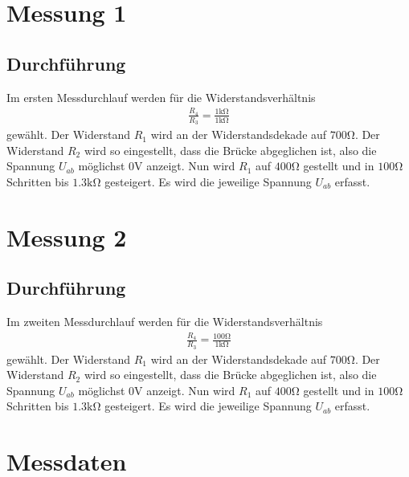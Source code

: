 \section[Messung 1]{Messung 1}
\subsection{Durchführung}

Im ersten Messdurchlauf werden für die Widerstandsverhältnis
\begin{align}
    \frac{R_4}{R_3} = \frac{1 \si{\kilo\ohm}}{1 \si{\kilo\ohm}}
\end{align}
gewählt.
Der Widerstand \( R_1 \) wird an der Widerstandsdekade auf \( 700 \si{\ohm} \).
Der Widerstand \( R_2 \) wird so eingestellt, dass die Brücke abgeglichen ist,
also die Spannung \( U_{ab} \) möglichst \( 0 \si{\volt} \) anzeigt.
Nun wird \( R_1 \) auf \( 400 \si{\ohm} \) gestellt und in \( 100 \si{\ohm} \) Schritten bis \( 1.3 \si{\kilo\ohm} \) gesteigert.
Es wird die jeweilige Spannung \( U_{ab} \) erfasst.

\section[Messung 2]{Messung 2}
\subsection{Durchführung}

Im zweiten Messdurchlauf werden für die Widerstandsverhältnis
\begin{align}
    \frac{R_4}{R_3} = \frac{100 \si{\ohm}}{1 \si{\kilo\ohm}}
\end{align}
gewählt.
Der Widerstand \( R_1 \) wird an der Widerstandsdekade auf \( 700 \si{\ohm} \).
Der Widerstand \( R_2 \) wird so eingestellt, dass die Brücke abgeglichen ist,
also die Spannung \( U_{ab} \) möglichst \( 0 \si{\volt} \) anzeigt.
Nun wird \( R_1 \) auf \( 400 \si{\ohm} \) gestellt und in \( 100 \si{\ohm} \) Schritten bis \( 1.3 \si{\kilo\ohm} \) gesteigert.
Es wird die jeweilige Spannung \( U_{ab} \) erfasst.

\section[Messdaten]{Messdaten}

